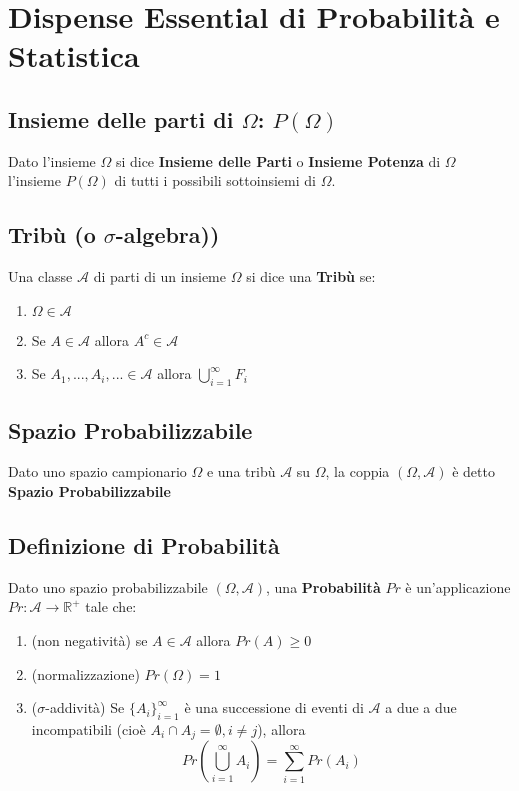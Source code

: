 \documentclass[12pt]{report}
\begin{document}
  \chapter{Dispense Essential di Probabilità e Statistica}

  \section{Insieme delle parti di $\Omega$: $P(\Omega)$}
  Dato l'insieme $\Omega$ si dice \textbf{Insieme delle Parti} o \textbf{Insieme Potenza} di $\Omega$ l'insieme $P(\Omega)$ di tutti i possibili sottoinsiemi di $\Omega$.

  \section{Tribù (o $\sigma$-algebra))}
  Una classe $\mathcal{A}$ di parti di un insieme $\Omega$ si dice una \textbf{Tribù} se:\\
  \begin{enumerate}
  \item $\Omega \in \mathcal{A}$
  \item Se $A \in \mathcal{A}$ allora $A^c \in \mathcal{A}$
  \item Se $A_1, ... ,A_i, ... \in \mathcal{A}$ allora $\bigcup\limits_{i=1}^{\infty} F_{i}$
  \end{enumerate}

  \section{Spazio Probabilizzabile}
  Dato uno spazio campionario $\Omega$ e una tribù $ \mathcal{A}$ su $\Omega$, la coppia $(\Omega,\mathcal{A})$ è detto \textbf{Spazio Probabilizzabile}

  \section{Definizione di Probabilità}
  Dato uno spazio probabilizzabile $(\Omega,\mathcal{A})$, una \textbf{Probabilità} $Pr$ è un'applicazione $Pr:\mathcal{A} \longrightarrow \mathbb{R}^+$ tale che:
  \begin{enumerate}
    \item (non negatività) se $A \in \mathcal{A}$ allora $Pr(A) \geq 0$
    \item (normalizzazione) $Pr(\Omega) = 1$
    \item ($\sigma$-addività) Se ${\{A_i\}}_{i=1}^{\infty}$ è una successione di eventi di $\mathcal{A}$ a due a due incompatibili (cioè $A_i \cap A_j = \emptyset, i \neq j$), allora
    \[ Pr(\bigcup\limits_{i=1}^{\infty} A_i) = \sum_{i=1}^{\infty} Pr(A_i) \]
  \end{enumerate}
\end{document}
